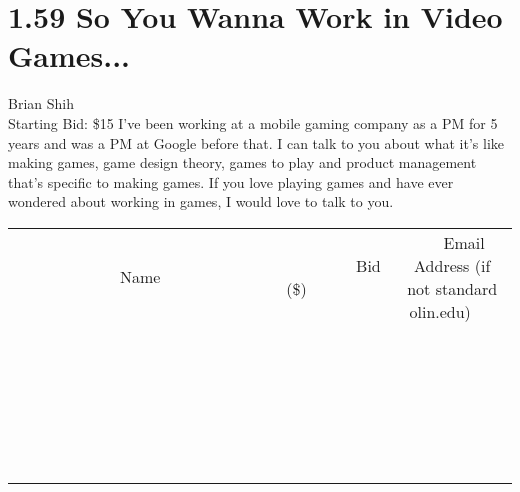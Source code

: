 \documentclass[11pt]{article}
\begin{document}
\section*{1.59 So You Wanna Work in Video Games...}
Brian Shih
\\
Starting Bid: \$15
\newline
I’ve been working at a mobile gaming company as a PM for 5 years and was a PM at Google before that. I can talk to you about what it’s like making games, game design theory, games to play and product management that’s specific to making games. If you love playing games and have ever wondered about working in games, I would love to talk to you.
\\[6ex]
\begin{tabular}{c c c}
~~~~~~~~~~~~~Name~~~~~~~~~~~~~ & ~~~~~~~~~Bid (\$)~~~~~~~~~  & ~~~Email Address (if not standard olin.edu)~~~\\
 & & \\
\hline
 & & \\
\hline
 & & \\
\hline
 & & \\
\hline
 & & \\
\hline
 & & \\
\hline
 & & \\
\hline
 & & \\
\hline
 & & \\
\hline
 & & \\
\hline
 & & \\
\hline
 & & \\
\hline
 & & \\
\hline
 & & \\
\hline
 & & \\
\hline
 & & \\
\hline
 & & \\
\hline
 & & \\
\hline
 & & \\
\hline
 & & \\
\hline
 & & \\
\hline
 & & \\
\hline
 & & \\
\hline
 & & \\
\hline
 & & \\
\hline
 & & \\
\hline
\end{tabular}
\newpage
\end{document}
